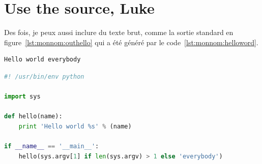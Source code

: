 \section{Use the source, Luke}


Des fois, je peux aussi inclure du texte brut, comme la sortie
standard en figure~\ref{lst:monnom:outhello} qui a été généré par le
code~\ref{lst:monnom:helloword}.

\begin{lstlisting}[language={},caption={Sortie standard},label={lst:monnom:outhello}]
Hello world everybody
\end{lstlisting}

\begin{lstlisting}[language={Python},caption={Mon premier code},label={lst:monnom:helloword}]
#! /usr/bin/env python

import sys

def hello(name):
    print 'Hello world %s' % (name)

if __name__ == '__main__':
    hello(sys.argv[1] if len(sys.argv) > 1 else 'everybody')
\end{lstlisting}



